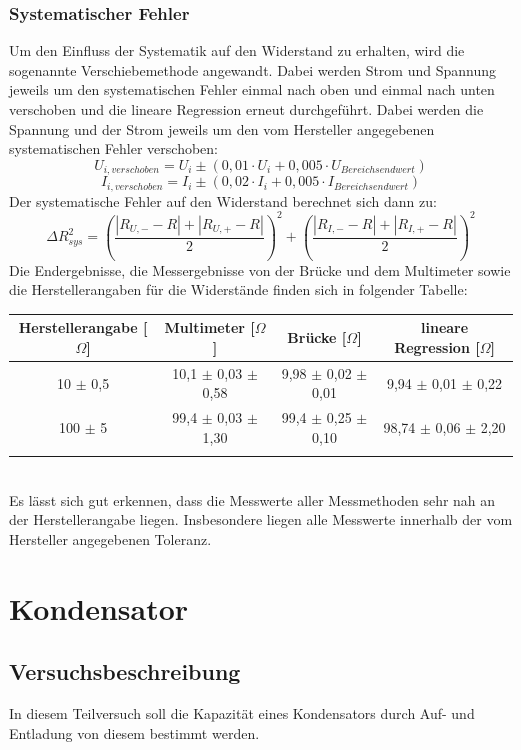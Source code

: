 \documentclass[12pt,a4paper]{article}
\begin{document}
\subsubsection{Systematischer Fehler}
Um den Einfluss der Systematik auf den Widerstand zu erhalten, wird die sogenannte Verschiebemethode angewandt. Dabei werden Strom und Spannung jeweils um den systematischen Fehler einmal nach oben und einmal nach unten verschoben und die lineare Regression erneut durchgeführt. Dabei werden die Spannung und der Strom jeweils um den vom Hersteller angegebenen systematischen Fehler verschoben:
\begin{equation}
U_{i, verschoben} = U_i \pm (0,01 \cdot U_i + 0,005 \cdot U_{Bereichsendwert})
\end{equation}
\begin{equation}
I_{i, verschoben} = I_i \pm (0,02 \cdot I_i + 0,005 \cdot I_{Bereichsendwert})
\end{equation}
Der systematische Fehler auf den Widerstand berechnet sich dann zu:
\begin{equation}
\Delta R_{sys}^2 = \left(\dfrac{|R_{U,-}-R| + |R_{U,+}-R|}{2}\right)^2 + \left(\dfrac{|R_{I,-}-R| + |R_{I,+}-R|}{2}\right)^2
\end{equation}
Die Endergebnisse, die Messergebnisse von der Brücke und dem Multimeter sowie die Herstellerangaben für die Widerstände finden sich in folgender Tabelle:\\
\begin{tabular}{|c|c|c|c|}
\hline 
Herstellerangabe [$\Omega$] & Multimeter [$\Omega$] & Brücke [$\Omega$] & lineare Regression [$\Omega$] \\ 
\hline 
10 $\pm$ 0,5 & 10,1 $\pm$ 0,03 $\pm$ 0,58 & 9,98 $\pm$ 0,02 $\pm$ 0,01 & 9,94 $\pm$ 0,01 $\pm$ 0,22 \\ 
\hline 
100 $\pm$ 5 & 99,4 $\pm$ 0,03 $\pm$ 1,30 & 99,4 $\pm$ 0,25 $\pm$ 0,10 & 98,74 $\pm$ 0,06 $\pm$ 2,20 \\ 
\hline 
\label{tab:Widerstand_Ergebnisse}
\end{tabular} \\
Es lässt sich gut erkennen, dass die Messwerte aller Messmethoden sehr nah an der Herstellerangabe liegen. Insbesondere liegen alle Messwerte innerhalb der vom Hersteller angegebenen Toleranz.
\newpage
\section{Kondensator}
\subsection{Versuchsbeschreibung}
In diesem Teilversuch soll die Kapazität eines Kondensators durch Auf- und Entladung von diesem bestimmt werden.
\end{document}
